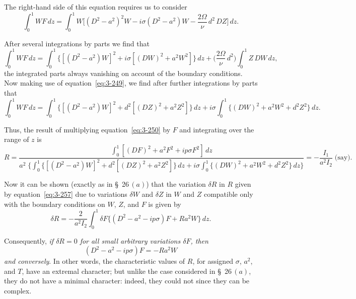 The right-hand side of this equation requires us to consider
\begin{equation}\label{eq:3-254}
\int_0^1 WF\,dz = \int_0^1 W\bigg[(D^2 - a^2)^2 W - i\sigma(D^2 - a^2)W - \frac{2\Omega}{\nu}\,d^2\,DZ\bigg]\,dz.
\end{equation}

After several integrations by parts we find that
\begin{equation}\label{eq:3-255}
\int_0^1 WF\,dz = \int_0^1 \{[(D^2 - a^2)W]^2 + i\sigma[(DW)^2 + a^2 W^2]\}\,dz + \bigg(\frac{2\Omega}{\nu}\,d^2\bigg)\int_0^1 Z\,DW\,dz,
\end{equation}
the integrated parts always vanishing on account of the boundary conditions. Now making use of equation~\eqref{eq:3-249}, we find after further integrations by parts that
\begin{equation}\label{eq:3-256}
\int_0^1 WF\,dz = \int_0^1 \{[(D^2 - a^2)W]^2 + d^2 [(DZ)^2 + a^2 Z^2]\}\,dz + i\sigma \int_0^1 \{(DW)^2 + a^2 W^2 + d^2 Z^2\}\,dz.
\end{equation}

Thus, the result of multiplying equation~\eqref{eq:3-250} by $F$ and integrating over the range of $z$ is
\begin{equation}\label{eq:3-257}
R = \frac{\displaystyle\int_0^1 [(DF)^2 + a^2 F^2 + ip\sigma F^2]\,dz}{a^2\;\displaystyle\bigg\{\int_0^1 \{[(D^2 - a^2)W]^2 + d^2 [(DZ)^2 + a^2 Z^2]\}\,dz + i\sigma \displaystyle\int_0^1 \{(DW)^2 + a^2 W^2 + d^2 Z^2\}\,dz\bigg\}}
= -\frac{I_1}{a^2 I_2} \;\text{(say)}.
\end{equation}

Now it can be shown (exactly as in \S~26\,$(a)$) that the variation $\delta R$ in $R$ given by equation~\eqref{eq:3-257} due to variations $\delta W$ and $\delta Z$ in $W$ and $Z$ compatible only with the boundary conditions on $W$, $Z$, and $F$ is given by
\begin{equation}\label{eq:3-258}
\delta R = -\frac{2}{a^2 I_2}\int_0^1 \delta F\{(D^2 - a^2 - ip\sigma)F + Ra^2 W\}\,dz.
\end{equation}

Consequently, \emph{if $\delta R = 0$ for all small arbitrary variations $\delta F$, then}
\begin{equation}\label{eq:3-259}
(D^2 - a^2 - ip\sigma)F = -Ra^2 W
\end{equation}
\emph{and conversely}. In other words, the characteristic values of $R$, for assigned $\sigma$, $a^2$, and $T$, have an extremal character; but unlike the case considered in \S~26\,$(a)$, they do not have a minimal character: indeed, they could not since they can be complex.

